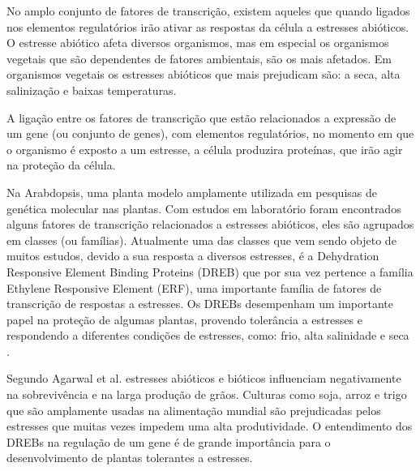 No amplo conjunto de fatores de transcrição, existem aqueles que quando ligados nos elementos regulatórios irão ativar as respostas da célula a estresses abióticos. O estresse abiótico afeta diversos organismos, mas em especial os organismos vegetais que são dependentes de fatores ambientais, são os mais afetados. Em organismos vegetais os estresses abióticos que mais prejudicam são: a seca, alta salinização e baixas temperaturas.

A ligação entre os fatores de transcrição que estão relacionados a expressão de um gene (ou conjunto de genes), com elementos regulatórios, no momento em que o organismo é exposto a um estresse, a célula produzira proteínas, que irão agir na proteção da célula.

Na Arabdopsis, uma planta modelo amplamente utilizada em pesquisas de genética molecular nas plantas. Com estudos em laboratório foram encontrados alguns fatores de transcrição relacionados a estresses abióticos, eles são agrupados em classes (ou famílias). Atualmente uma das classes que vem sendo objeto de muitos estudos, devido a sua resposta a diversos estresses, é a Dehydration Responsive Element Binding Proteins (DREB) que por sua vez pertence a família Ethylene Responsive Element (ERF), uma importante família de fatores de transcrição de respostas a estresses. Os DREBs desempenham um importante papel na proteção de algumas plantas, provendo tolerância a estresses e respondendo a diferentes condições de estresses, como: frio, alta salinidade e seca \cite{Agarwal2006}.

Segundo Agarwal et al.\cite{Agarwal2006} estresses abióticos e bióticos influenciam negativamente na sobrevivência e na larga produção de grãos. Culturas como soja, arroz e trigo que são amplamente usadas na alimentação mundial são prejudicadas pelos estresses que muitas vezes impedem uma alta produtividade. O entendimento dos DREBs na regulação de um gene é de grande importância para o desenvolvimento de plantas tolerantes a estresses.

